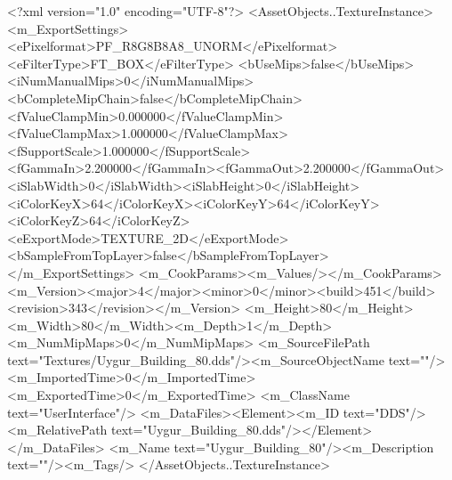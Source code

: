<?xml version="1.0" encoding="UTF-8"?>
<AssetObjects..TextureInstance>
  <m_ExportSettings>
    <ePixelformat>PF_R8G8B8A8_UNORM</ePixelformat><eFilterType>FT_BOX</eFilterType>
    <bUseMips>false</bUseMips><iNumManualMips>0</iNumManualMips><bCompleteMipChain>false</bCompleteMipChain>
    <fValueClampMin>0.000000</fValueClampMin><fValueClampMax>1.000000</fValueClampMax><fSupportScale>1.000000</fSupportScale>
    <fGammaIn>2.200000</fGammaIn><fGammaOut>2.200000</fGammaOut><iSlabWidth>0</iSlabWidth><iSlabHeight>0</iSlabHeight>
    <iColorKeyX>64</iColorKeyX><iColorKeyY>64</iColorKeyY><iColorKeyZ>64</iColorKeyZ>
    <eExportMode>TEXTURE_2D</eExportMode><bSampleFromTopLayer>false</bSampleFromTopLayer>
  </m_ExportSettings>
  <m_CookParams><m_Values/></m_CookParams>
  <m_Version><major>4</major><minor>0</minor><build>451</build><revision>343</revision></m_Version>
  <m_Height>80</m_Height><m_Width>80</m_Width><m_Depth>1</m_Depth><m_NumMipMaps>0</m_NumMipMaps>
  <m_SourceFilePath text="Textures/Uygur_Building_80.dds"/><m_SourceObjectName text=""/>
  <m_ImportedTime>0</m_ImportedTime><m_ExportedTime>0</m_ExportedTime>
  <m_ClassName text="UserInterface"/>
  <m_DataFiles><Element><m_ID text="DDS"/><m_RelativePath text="Uygur_Building_80.dds"/></Element></m_DataFiles>
  <m_Name text="Uygur_Building_80"/><m_Description text=""/><m_Tags/>
</AssetObjects..TextureInstance>
